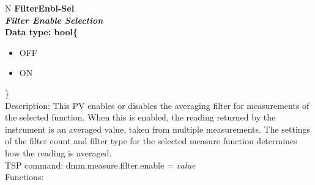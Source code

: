 \documentclass[openany]{article}
\begin{document}
		\begin{tabular}{N}
			\hline
			\bfseries FilterEnbl-Sel\label{pv:filterenbl-sel} \\ \hline
			\emph{Filter Enable Selection} \\
			Data type: bool\{\begin{itemize}[noitemsep]
				\item[] OFF
				\item[] ON
			\end{itemize}\} \\
			Description: This PV enables or disables the averaging filter for measurements of the selected function. When this is enabled, the reading returned by the instrument is an averaged value, taken from multiple measurements. The settings of the filter count and filter type for the selected measure function determines how the reading is averaged. \\
			TSP command: dmm.measure.filter.enable = \emph{value} \\
			Functions: \\
			\arrayrulecolor{\FuncTableBorderColor}

		\end{tabular}
\end{document}
